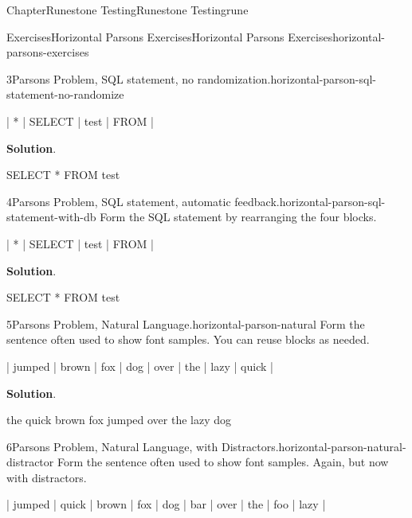 \documentclass[oneside,10pt,]{book}
\newcommand{\blocktitlefont}{\relax}
\numberwithin{equation}{section}
\begin{document}
\begin{chapterptx}{Chapter}{Runestone Testing}{}{Runestone Testing}{}{}{rune}
\begin{exercises-section}{Exercises}{Horizontal Parsons Exercises}{}{Horizontal Parsons Exercises}{}{}{horizontal-parsons-exercises}
\begin{divisionexercise}{3}{Parsons Problem, SQL statement, no randomization.}{}{horizontal-parson-sql-statement-no-randomize}
\par
%
\begin{codedisplay}
 | * | SELECT | test | FROM | 
\end{codedisplay}
%
\par\smallskip%
\noindent\textbf{\blocktitlefont Solution}.\hypertarget{horizontal-parson-sql-statement-no-randomize-3}{}\quad{}%
\begin{codedisplay}
SELECT * FROM test
\end{codedisplay}
%
\end{divisionexercise}%
\begin{divisionexercise}{4}{Parsons Problem, SQL statement, automatic feedback.}{}{horizontal-parson-sql-statement-with-db}%
Form the SQL statement by rearranging the four blocks.%
\par
%
\begin{codedisplay}
 | * | SELECT | test | FROM | 
\end{codedisplay}
%
\par\smallskip%
\noindent\textbf{\blocktitlefont Solution}.\hypertarget{horizontal-parson-sql-statement-with-db-3}{}\quad{}%
\begin{codedisplay}
SELECT * FROM test
\end{codedisplay}
%
\end{divisionexercise}%
\begin{divisionexercise}{5}{Parsons Problem, Natural Language.}{}{horizontal-parson-natural}%
Form the sentence often used to show font samples.  You can reuse blocks as needed.%
\par
%
\begin{codedisplay}
 | jumped | brown | fox | dog | over | the | lazy | quick | 
\end{codedisplay}
%
\par\smallskip%
\noindent\textbf{\blocktitlefont Solution}.\hypertarget{horizontal-parson-natural-3}{}\quad{}%
\begin{codedisplay}
the quick brown fox jumped over the lazy dog
\end{codedisplay}
%
\end{divisionexercise}%
\begin{divisionexercise}{6}{Parsons Problem, Natural Language, with Distractors.}{}{horizontal-parson-natural-distractor}%
Form the sentence often used to show font samples.  Again, but now with distractors.%
\par
%
\begin{codedisplay}
 | jumped | quick | brown | fox | dog | bar | over | the | foo | lazy | 

\end{codedisplay}
\end{divisionexercise}
\end{exercises-section}
\end{chapterptx}
\end{document}
